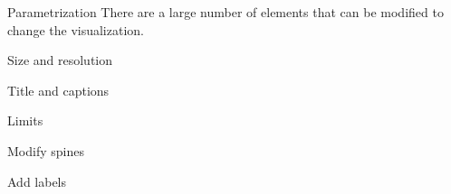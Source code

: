 \begin{frame}{Parametrization}
    There are a large number of elements that can be modified to change the visualization.
\end{frame}

\begin{frame}{Size and resolution}
    \begin{minipage}[t]{0.49\linewidth}
    \end{minipage}
    \begin{minipage}[t]{0.49\linewidth}
    \end{minipage}
\end{frame} 

\begin{frame}{Title and captions}
    \begin{minipage}{0.49\linewidth}
    \end{minipage}
    \begin{minipage}{0.49\linewidth}
    \end{minipage}
\end{frame}

\begin{frame}{Limits}
    \begin{minipage}{0.49\linewidth}
    \end{minipage}
    \begin{minipage}{0.49\linewidth}
    \end{minipage}
\end{frame}

\begin{frame}{Modify spines}
    \begin{minipage}{0.52\linewidth}
    \end{minipage}
    \begin{minipage}{0.46\linewidth}
    \end{minipage}
\end{frame}

\begin{frame}{Add labels}
    \begin{minipage}[c]{0.49\linewidth}
    \end{minipage}
    \begin{minipage}[c]{0.49\linewidth}
    \end{minipage}
\end{frame}

